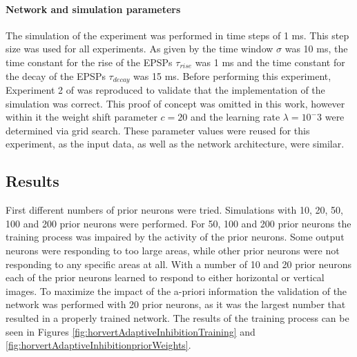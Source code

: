 \paragraph{Network and simulation parameters}

The simulation of the experiment was performed in time steps of 1 ms. This step size was used for all experiments. As given by \citet{nessler} the time window $\sigma$ was 10 ms, the time constant for the rise of the EPSPs $\tau_{rise}$ was 1 ms and the time constant for the decay of the EPSPs $\tau_{decay}$ was 15 ms. Before performing this experiment, Experiment 2 of \citet{nessler} was reproduced to validate that the implementation of the simulation was correct. This proof of concept was omitted in this work, however within it the weight shift parameter $c = 20$ and the learning rate $\lambda = 10^-3$ were determined via grid search. These parameter values were reused for this experiment, as the input data, as well as the network architecture, were similar.

\subsection{Results}


First different numbers of prior neurons were tried. Simulations with 10, 20, 50, 100 and 200 prior neurons were performed. For 50, 100 and 200 prior neurons the training process was impaired by the activity of the prior neurons. Some output neurons were responding to too large areas, while other prior neurons were not responding to any specific areas at all. With a number of 10 and 20 prior neurons each of the prior neurons learned to respond to either horizontal or vertical images. To maximize the impact of the a-priori information the validation of the network was performed with 20 prior neurons, as it was the largest number that resulted in a properly trained network. The results of the training process can be seen in Figures \ref{fig:horvertAdaptiveInhibitionTraining} and
 \ref{fig:horvertAdaptiveInhibitionpriorWeights}.


